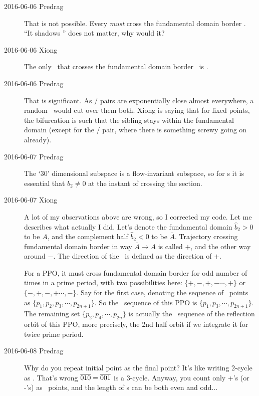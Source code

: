 \begin{description}
\item[2016-06-06 Predrag]
That is not possible. Every  \emph{must} cross the fundamental
domain border \PoincSec. ``It shadows '' does not matter, why
would it?

\item[2016-06-06 Xiong]
The only \rpo\ that crosses the fundamental domain
border \PoincSec\ is .

\item[2016-06-06 Predrag]
That is significant. As  /  pairs are exponentially
close almost everywhere, a random \PoincSec\ would cut over them both.
Xiong is saying that for  fixed points, the bifurcation is such
that the sibling  stays within the fundamental domain
(except for the  /  pair, where there is something screwy
going on already).

\item[2016-06-07 Predrag]
The `30' dimensional subspace is a flow-invariant subspace, so for \ppo s
it is essential that $b_2 \neq 0$ at the instant of crossing the section.

\item[2016-06-07 Xiong]
A lot of my observations above are wrong, so I corrected my code.
Let me describes what actually I did.
Let's denote the fundamental domain $\hat{b}_2 > 0$ to be $A$, and the complement
half $\hat{b}_2 < 0$ to be $\bar{A}$. Trajectory crossing fundamental domain
border in way $\bar{A}\to A$ is called $+$, and the other way around $-$.
The direction of the \PoincSec\ is defined as the direction of $+$.

For a PPO, it must cross fundamental domain border for odd number of times in a prime
period, with two possibilities here: $\{+,-,+,-\cdots,+\}$ or
$\{-,+,-,+\cdots,-\}$. Say for the first case, denoting the sequence
of \PoincSec\ points as
$\{p_1, p_2, p_3,\cdots, p_{2n+1}\}$. So the \PoincSec\ sequence
of this PPO is
$\{p_1, p_3, \cdots, p_{2n+1}\}$. The remaining set $\{p_2, p_4, \cdots, p_{2n}\}$
is actually the \PoincSec\ sequence of the reflection orbit
of this PPO, more precisely, the 2nd half orbit if we integrate it for twice prime
period.

\item[2016-06-08 Predrag]
Why do you repeat initial point as the final point? It's like writing
2-cycle  as . That's wrong ${\overline{010}} = {\overline{001}}$
is a 3-cycle. Anyway, you count only +'s (or -'s) as \PoincSec\ points,
and the length of \ppo s can be both even and odd...



\end{description}
